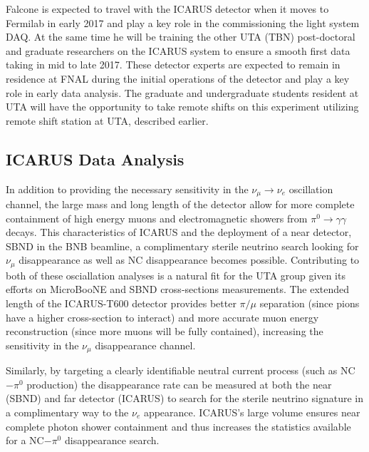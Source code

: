 Falcone is expected to travel with the ICARUS detector when it moves to Fermilab in early 2017 and play a key role in the commissioning the light system DAQ. At the same time he will be training the other UTA (TBN) post-doctoral and graduate researchers on the ICARUS system to ensure a smooth first data taking in mid to late 2017. These detector experts are expected to remain in residence at FNAL during the initial operations of the detector and play a key role in early data analysis. The graduate and undergraduate students resident at UTA will have the opportunity to take remote shifts on this experiment utilizing remote shift station at UTA, described earlier.

\subsection{ICARUS Data Analysis}\label{sec:ICARUSDataAnalysis}
In addition to providing the necessary sensitivity in the $\nu_{\mu} \rightarrow \nu_{e}$ oscillation channel, the large mass and long length of the detector allow for more complete containment of high energy muons and electromagnetic showers from $\pi^{0} \rightarrow \gamma \gamma$ decays.  This characteristics of ICARUS and the deployment of a near detector, SBND in the BNB beamline, a complimentary sterile neutrino search looking for $\nu_{\mu}$  disappearance as well as  NC disappearance becomes possible. Contributing to both of these osciallation analyses is a natural fit for the UTA group given its efforts on MicroBooNE and SBND cross-sections measurements. The extended length of the ICARUS-T600 detector provides better $\pi / \mu$ separation (since pions have a higher cross-section to interact) and more accurate muon energy reconstruction (since more muons will be fully contained), increasing the sensitivity in the $\nu_{\mu}$ disappearance channel. 

Similarly, by targeting a clearly identifiable neutral current process (such as NC$-\pi^{0}$ production) the disappearance rate can be measured at both the near (SBND) and far detector (ICARUS) to search for the sterile neutrino signature in a complimentary way to the $\nu_{e}$ appearance. ICARUS's large volume ensures near complete photon shower containment and thus increases the statistics available for a NC$-\pi^{0}$ disappearance search.

